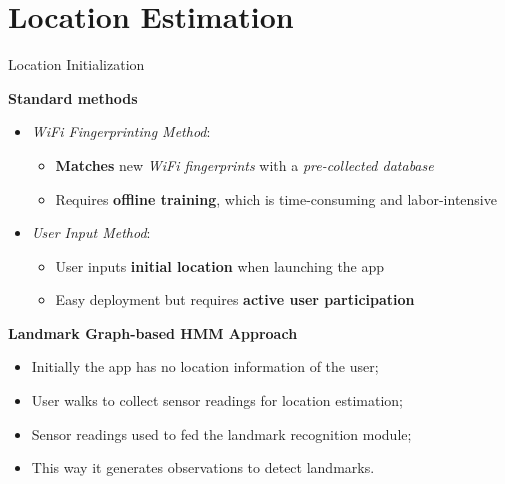 \section[Esteem]{Location Estimation}

\begin{frame}{Location Initialization}
    
    \textbf{Standard methods}
    
    \begin{itemize}
        \item \textit{WiFi Fingerprinting Method}:
            \begin{itemize}
                \item \textbf{Matches} new \textit{WiFi fingerprints} with a \textit{pre-collected database}
                \item Requires \textbf{offline training}, which is time-consuming and labor-intensive
            \end{itemize}    
        \item \textit{User Input Method}:
            \begin{itemize}
                \item User inputs \textbf{initial location} when launching the app
                \item Easy deployment but requires \textbf{active user participation}
            \end{itemize}
    \end{itemize}
    
    \textbf{Landmark Graph-based HMM Approach}
    \begin{itemize}
        \item Initially the app has no location information of the user;
        \item User walks to collect sensor readings for location estimation;
        \item Sensor readings used to fed the landmark recognition module;
        \item This way it generates observations to detect landmarks.
    \end{itemize}

\end{frame}
